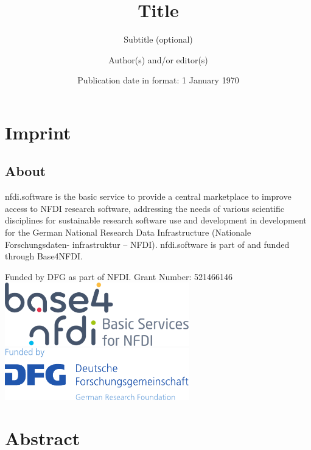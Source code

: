 \documentclass[headsepline,titlepage,twoside,12pt]{scrreprt}
\author{Author(s) and/or editor(s)}
\date{Publication date in format: 1 January 1970}
\title{Title}
\subtitle{Subtitle (optional)}
\begin{document}
\allowdisplaybreaks%


\maketitle

\chapter*{Imprint}\label{ch:introduction}
\section{About}
nfdi.software is the basic service to provide a central marketplace to improve access to NFDI research software, addressing the needs of various scientific disciplines for sustainable research software use and development in development for the German National Research Data Infrastructure (Nationale Forschungsdaten-
infrastruktur – NFDI).
nfdi.software is part of and funded through Base4NFDI.

Funded by DFG as part of NFDI. Grant Number: 521466146
\includegraphics[width=8cm]{img/base.png}
\includegraphics[width=8cm]{img/dfg.pdf}

\chapter*{Abstract}\label{ch:abstract}

\end{document}
